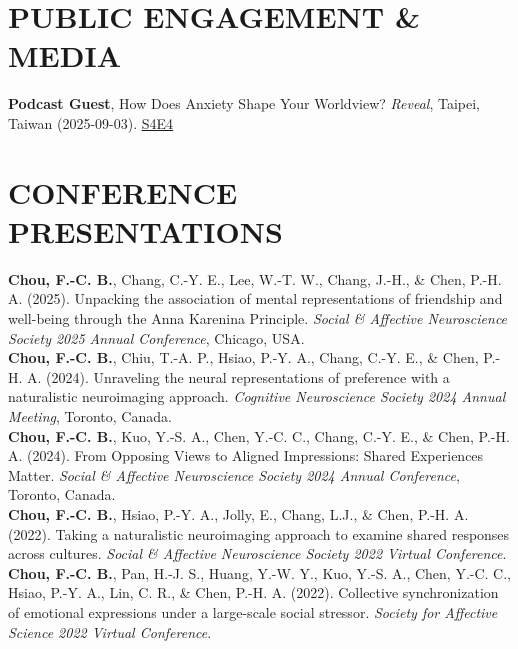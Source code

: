 \documentclass[a4paper,12pt]{article}
\newcommand{\sectionspace}{0pt} %
\newcommand{\itemspace}{7pt} %
\begin{document}
\section*{PUBLIC ENGAGEMENT \& MEDIA}
\noindent\textbf{Podcast Guest}, How Does Anxiety Shape Your Worldview? \textit{Reveal}, Taipei, Taiwan (2025-09-03). \href{https://podcasts.apple.com/tw/podcast/%E9%87%8D%E6%95%B4%E8%A9%95%E4%BC%B0/id1747099567?l=en-GB&i=1000724790000}{S4E4} \\[\itemspace]

\vspace{\sectionspace}

\section*{CONFERENCE PRESENTATIONS}
\noindent\textbf{Chou, F.-C. B.}, Chang, C.-Y. E., Lee, W.-T. W., Chang, J.-H., \& Chen, P.-H. A. (2025). Unpacking the association of mental representations of friendship and well-being through the Anna Karenina Principle. \textit{Social \& Affective Neuroscience Society 2025 Annual Conference}, Chicago, USA. \\[\itemspace]
\noindent\textbf{Chou, F.-C. B.}, Chiu, T.-A. P., Hsiao, P.-Y. A., Chang, C.-Y. E., \& Chen, P.-H. A. (2024). Unraveling the neural representations of preference with a naturalistic neuroimaging approach. \textit{Cognitive Neuroscience Society 2024 Annual Meeting}, Toronto, Canada.\\[\itemspace]
\noindent\textbf{Chou, F.-C. B.}, Kuo, Y.-S. A., Chen, Y.-C. C., Chang, C.-Y. E., \& Chen, P.-H. A. (2024). From Opposing Views to Aligned Impressions: Shared Experiences Matter. \textit{Social \& Affective Neuroscience Society 2024 Annual Conference}, Toronto, Canada. \\[\itemspace]
\noindent\textbf{Chou, F.-C. B.}, Hsiao, P.-Y. A., Jolly, E., Chang, L.J., \& Chen, P.-H. A. (2022). Taking a naturalistic neuroimaging approach to examine shared responses across cultures. \textit{Social \& Affective Neuroscience Society 2022 Virtual Conference}.\\[\itemspace]
\noindent\textbf{Chou, F.-C. B.}, Pan, H.-J. S., Huang, Y.-W. Y., Kuo, Y.-S. A., Chen, Y.-C. C., Hsiao, P.-Y. A., Lin, C. R., \& Chen, P.-H. A. (2022). Collective synchronization of emotional expressions under a large-scale social stressor. \textit{Society for Affective Science 2022 Virtual Conference}.\\[\itemspace]

\vspace{\sectionspace}
\end{document}
